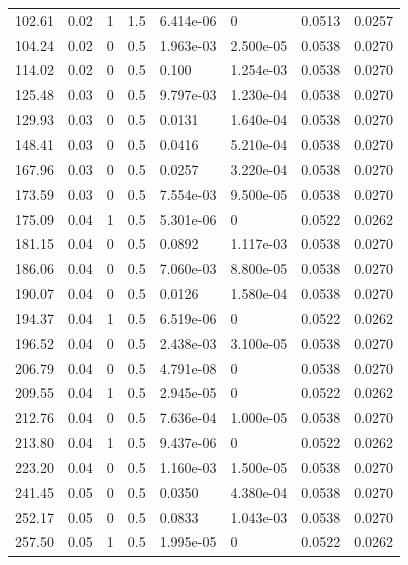 \documentclass[preview]{standalone}
\begin{document}
{{\begin{tabular}{L{1.2cm}C{1.2cm} C{0.3cm}C{0.5cm} C{1.4cm}C{1.4cm} C{1.4cm}C{1.4cm}}
  102.61  &  0.02  & 1     & 1.5 &  6.414e-06  & 0  & 0.0513 &  0.0257   \\ 
  104.24  &  0.02  & 0     & 0.5 &  1.963e-03  & 2.500e-05  & 0.0538 &  0.0270   \\ 
  114.02  &  0.02  & 0     & 0.5 &  0.100  & 1.254e-03  & 0.0538 &  0.0270   \\ 
  125.48  &  0.03  & 0     & 0.5 &  9.797e-03  & 1.230e-04  & 0.0538 &  0.0270   \\ 
  129.93  &  0.03  & 0     & 0.5 &  0.0131  & 1.640e-04  & 0.0538 &  0.0270   \\ 
  148.41  &  0.03  & 0     & 0.5 &  0.0416  & 5.210e-04  & 0.0538 &  0.0270   \\ 
  167.96  &  0.03  & 0     & 0.5 &  0.0257  & 3.220e-04  & 0.0538 &  0.0270   \\ 
  173.59  &  0.03  & 0     & 0.5 &  7.554e-03  & 9.500e-05  & 0.0538 &  0.0270   \\ 
  175.09  &  0.04  & 1     & 0.5 &  5.301e-06  & 0  & 0.0522 &  0.0262   \\ 
  181.15  &  0.04  & 0     & 0.5 &  0.0892  & 1.117e-03  & 0.0538 &  0.0270   \\ 
  186.06  &  0.04  & 0     & 0.5 &  7.060e-03  & 8.800e-05  & 0.0538 &  0.0270   \\ 
  190.07  &  0.04  & 0     & 0.5 &  0.0126  & 1.580e-04  & 0.0538 &  0.0270   \\ 
  194.37  &  0.04  & 1     & 0.5 &  6.519e-06  & 0  & 0.0522 &  0.0262   \\ 
  196.52  &  0.04  & 0     & 0.5 &  2.438e-03  & 3.100e-05  & 0.0538 &  0.0270   \\ 
  206.79  &  0.04  & 0     & 0.5 &  4.791e-08  & 0  & 0.0538 &  0.0270   \\ 
  209.55  &  0.04  & 1     & 0.5 &  2.945e-05  & 0  & 0.0522 &  0.0262   \\ 
  212.76  &  0.04  & 0     & 0.5 &  7.636e-04  & 1.000e-05  & 0.0538 &  0.0270   \\ 
  213.80  &  0.04  & 1     & 0.5 &  9.437e-06  & 0  & 0.0522 &  0.0262   \\ 
  223.20  &  0.04  & 0     & 0.5 &  1.160e-03  & 1.500e-05  & 0.0538 &  0.0270   \\ 
  241.45  &  0.05  & 0     & 0.5 &  0.0350  & 4.380e-04  & 0.0538 &  0.0270   \\ 
  252.17  &  0.05  & 0     & 0.5 &  0.0833  & 1.043e-03  & 0.0538 &  0.0270   \\ 
  257.50  &  0.05  & 1     & 0.5 &  1.995e-05  & 0  & 0.0522 &  0.0262   \\ 

\end{tabular}}}
\end{document}
